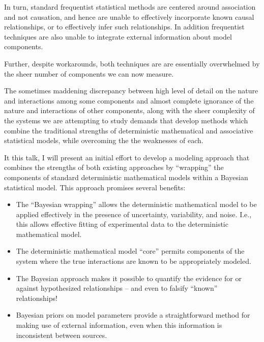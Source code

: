 \documentclass{beamer}
\begin{document}
  In turn, standard frequentist statistical methods are centered
  around association and not causation, and hence are unable to
  effectively incorporate known causal relationships, or to
  effectively infer such relationships.  In addition frequentist
  techniques are also unable to integrate external information about
  model components.
  
  Further, despite workarounds, both techniques are are essentially
  overwhelmed by the sheer number of components we can now measure.
  
  The sometimes maddening discrepancy between high level of detail on
  the nature and interactions among some components and almost
  complete ignorance of the nature and interactions of other
  components, along with the sheer complexity of the systems we are
  attempting to study demands that develop methods which combine the
  traditional strengths of deterministic mathematical and associative
  statistical models, while overcoming the the weaknesses of each.
  
  It this talk, I will present an initial effort to develop a modeling
  approach that combines the strengths of both existing approaches by
  ``wrapping'' the components of standard deterministic mathematical
  models within a Bayesian statistical model. This approach promises
  several benefits:
  \begin{itemize}
  \item The ``Bayesian wrapping'' allows the deterministic
    mathematical model to be applied effectively in the presence of
    uncertainty, variability, and noise. I.e., this allows effective
    fitting of experimental data to the deterministic mathematical
    model.
  \item The deterministic mathematical model ``core'' permits
    components of the system where the true interactions are known to
    be appropriately modeled.
  \item The Bayesian approach makes it possible to quantify the
    evidence for or against hypothesized relationships -- and even to
    falsify ``known'' relationships!
  \item Bayesian priors on model parameters provide a straightforward
    method for making use of external information, even when this
    information is inconsistent between sources.
  \end{itemize}
\end{document}
